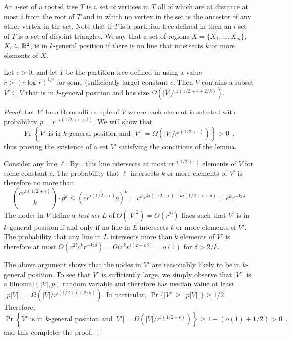 \documentclass{patmorin}
\begin{document}
An $i$-set of a rooted tree $T$ is a set of vertices in $T$ all of
which are at distance at most $i$ from the root of $T$ and in which
no vertex in the set is the ancestor of any other vertex in the set.
Note that if $T$ is a partition tree defined in 
then an $i$-set of $T$ is a set of disjoint triangles.  We say that a set
of regions $X=\{X_1,\ldots,X_m\}$, $X_i\subseteq\mathbb{R}^2$, is in $k$-general
position if there is no line that intersects $k$ or more elements of $X$.

\begin{lem}
  Let $\epsilon > 0$, and let $T$ be the partition tree defined in
   using a value $r>(c\log r)^{1/\epsilon}$ for
  some (sufficiently large) constant $c$. 
  Then $V$ contains a subset
  $V'\subseteq V$ that is in $k$-general position and has size
  $\Omega(|V|/r^{i(1/2+\epsilon + 2/k)})$.
\end{lem}

\begin{proof}
  Let $V'$ be a Bernoulli sample of $V$ where
  each element is selected with probability $p=r^{-i(1/2+\epsilon+\delta)}$.  We will show that
  \[
     \Pr\left\{
        \mbox{$V'$ is in $k$-general position 
          and $|V'|=\Omega(|V|/r^{i(1/2+\epsilon)})$}
      \right\} > 0 \enspace ,
  \]
  thus proving the existence of a set $V'$ satisfying the conditions of
  the lemma.

  Consider any line $\ell$. By , this line
  intersects at most $cr^{i(1/2+\epsilon)}$ elements of $V$ for some
  constant $c$. The probability that $\ell$ intersects $k$ or more
  elements of $V'$ is therefore no more than
  \[
    \binom{cr^{i(1/2+\epsilon)}}{k}\cdot p^k
    \le (cr^{i(1/2+\epsilon)}p)^k
    = c^kr^{ki(1/2+\epsilon)-ki(1/2+\epsilon+\delta)}
    = c^kr^{-ki\delta}
  \]
  The nodes in $V$ define a \emph{test set} $L$ of $O(|V|^2)=O(r^{2i})$
  lines such that $V'$ is in $k$-general position if and only if no line
  in $L$ intersects $k$ or more elements of $V'$.   The probability that
  any line in $L$ intersects more than $k$ elements of $V'$ is therefore
  at most $O(r^{2i}c^kr^{-ki\delta})=O(c^kr^{i(2-k\delta)}=o(1)$ for
  $\delta > 2/k$.

  The above argument shows that the nodes in $V'$ are reasonably likely
  to be in $k$-general position.  To see that $V'$ is sufficiently
  large, we simply observe that $|V'|$ is a $\mathrm{binomal}(|V|,p)$
  random variable and therefore has median value at least
  $\lfloor{p|V|}\rfloor=\Omega(|V|/r^{i(1/2+\epsilon + 2/k)})$.
  In particular, $\Pr\{|V'|\ge \lfloor{p|V|}\rfloor\}\ge 1/2$.  Therefore,
  \[
     \Pr\left\{
        \mbox{$V'$ is in $k$-general position 
          and $|V'|=\Omega(|V|/r^{i(1/2+\epsilon)})$}
      \right\} \ge 1- (o(1) + 1/2) > 0 \enspace ,
  \]
and this completes the proof.
\end{proof}
\end{document}
